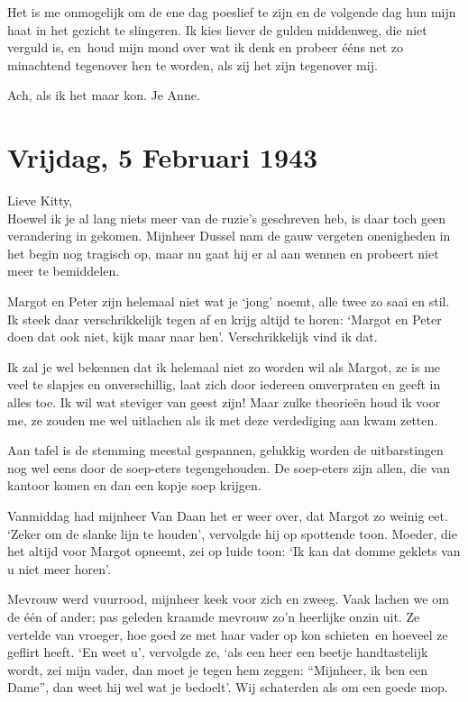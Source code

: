 \documentclass{book}
\begin{document}
Het is me onmogelijk om de ene dag poeslief te zijn en de volgende dag hun mijn
haat in het gezicht te slingeren. Ik kies liever de gulden middenweg, die niet
verguld is, en~houd mijn mond over wat ik denk en probeer ééns net zo minachtend
tegenover hen te worden, als zij het zijn tegenover mij.

Ach, als ik het maar kon. Je Anne.

\section*{Vrijdag, 5 Februari 1943}

Lieve Kitty,\\
Hoewel ik je al lang niets meer van de ruzie's geschreven heb, is
daar toch geen verandering in gekomen. Mijnheer Dussel nam de gauw vergeten
onenigheden in het begin nog tragisch op, maar nu gaat hij er al aan wennen en
probeert niet meer te bemiddelen.

Margot en Peter zijn helemaal niet wat je `jong' noemt, alle twee zo saai en
stil. Ik steek daar verschrikkelijk tegen af en krijg altijd te horen: `Margot
en Peter doen dat ook niet, kijk maar naar hen'.  Verschrikkelijk vind ik dat.

Ik zal je wel bekennen dat ik helemaal niet zo worden wil als Margot, ze is me
veel te slapjes en onverschillig, laat zich door iedereen omverpraten en geeft
in alles toe. Ik wil wat steviger van geest zijn!  Maar zulke theorieën houd ik
voor me, ze zouden me wel uitlachen als ik met deze verdediging aan kwam zetten.

Aan tafel is de stemming meestal gespannen, gelukkig worden de uitbarstingen nog
wel eens door de soep-eters tegengehouden. De soep-eters zijn allen, die van
kantoor komen en dan een kopje soep krijgen.

Vanmiddag had mijnheer Van Daan het er weer over, dat Margot zo weinig eet.
`Zeker om de slanke lijn te houden', vervolgde hij op spottende toon. Moeder,
die het altijd voor Margot opneemt, zei op luide toon: `Ik kan dat domme geklets
van u niet meer horen'.

Mevrouw werd vuurrood, mijnheer keek voor zich en zweeg. Vaak lachen we om de
één of ander; pas geleden kraamde mevrouw zo'n heerlijke onzin uit. Ze vertelde
van vroeger, hoe goed ze met haar vader op kon schieten~en hoeveel ze geflirt
heeft. `En weet u', vervolgde ze, `als een heer een beetje handtastelijk wordt,
zei mijn vader, dan moet je tegen hem zeggen: ``Mijnheer, ik ben een Dame'', dan
weet hij wel wat je bedoelt'. Wij schaterden als om een goede mop.
\end{document}
